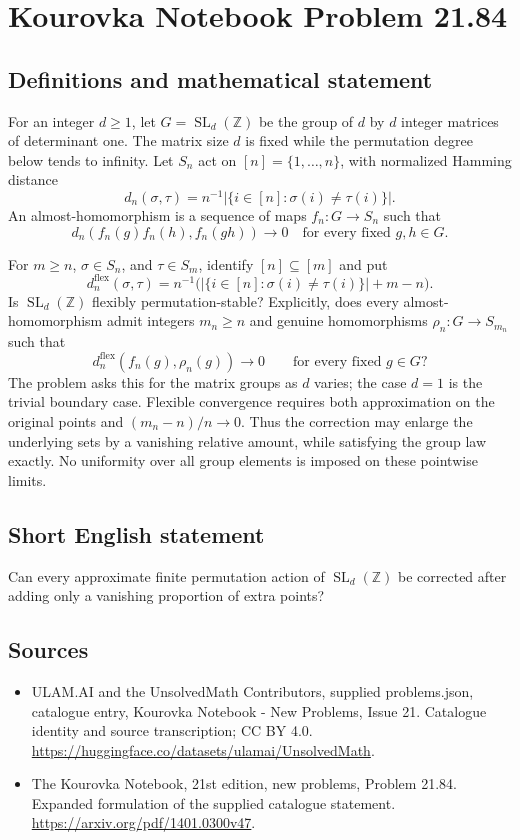 \documentclass[11pt,a4paper]{article}
\begin{document}
\section*{Kourovka Notebook Problem 21.84}\label{statement}

\subsection{Definitions and mathematical statement}
For an integer $d\ge1$, let $G=\operatorname{SL}_d(\mathbb Z)$ be the group of $d$ by $d$ integer matrices of determinant one. The matrix size $d$ is fixed while the permutation degree below tends to infinity. Let $S_n$ act on $[n]=\{1,\ldots,n\}$, with normalized Hamming distance
\[
 d_n(\sigma,\tau)=n^{-1}|\{i\in[n]:\sigma(i)\ne\tau(i)\}|.
\]
An almost-homomorphism is a sequence of maps $f_n:G\to S_n$ such that
\[
 d_n(f_n(g)f_n(h),f_n(gh))\longrightarrow0
 \quad\text{for every fixed }g,h\in G.
\]

For $m\ge n$, $\sigma\in S_n$, and $\tau\in S_m$, identify $[n]\subseteq[m]$ and put
\[
 d_n^{\mathrm{flex}}(\sigma,\tau)
 =n^{-1}\bigl(|\{i\in[n]:\sigma(i)\ne\tau(i)\}|+m-n\bigr).
\]
Is $\operatorname{SL}_d(\mathbb Z)$ flexibly permutation-stable? Explicitly, does every almost-homomorphism admit integers $m_n\ge n$ and genuine homomorphisms $\rho_n:G\to S_{m_n}$ such that
\[
 d_n^{\mathrm{flex}}(f_n(g),\rho_n(g))\longrightarrow0
 \qquad\text{for every fixed }g\in G?
\]
The problem asks this for the matrix groups as $d$ varies; the case $d=1$ is the trivial boundary case. Flexible convergence requires both approximation on the original points and $(m_n-n)/n\to0$. Thus the correction may enlarge the underlying sets by a vanishing relative amount, while satisfying the group law exactly. No uniformity over all group elements is imposed on these pointwise limits.
\subsection{Short English statement}
Can every approximate finite permutation action of $\operatorname{SL}_d(\mathbb Z)$ be corrected after adding only a vanishing proportion of extra points?
\subsection{Sources}
\begin{itemize}
\item[S1] ULAM.AI and the UnsolvedMath Contributors, supplied problems.json, catalogue entry, Kourovka Notebook - New Problems, Issue 21. Catalogue identity and source transcription; CC BY 4.0.
\url{https://huggingface.co/datasets/ulamai/UnsolvedMath}.
\item[S2] The Kourovka Notebook, 21st edition, new problems, Problem 21.84. Expanded formulation of the supplied catalogue statement.
\url{https://arxiv.org/pdf/1401.0300v47}.
\end{itemize}
\end{document}
